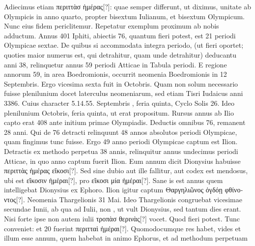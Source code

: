 
%
Adiecimus etiam \textgreek{περιττὰσ ἡμέρας[?]}:
quae semper differunt, ut diximus, unitate ab Olympicis in anno quarto,
propter bisextum Iulianum, et bisextum Olympicum.
Nunc eius
fidem periclitemur.
Repetatur exemplum proximum ab nobis adductum.
Annus 401 Iphiti, abiectis 76, quantum fieri potest, est 21 periodi
Olympicae sextae.
De quibus si accommodata integra periodo,
(ut fieri oportet; quoties maior numerus est, qui detrahitur, quam unde
detrahitur) deducantu anni 38, relinquetur annus 59 periodi
Atticae in Tabula periodi.
%
E regione annorum 59, in area Boedromionis,
occurrit neomenia Boedromionis in 12 Septembris.
Ergo vicesima
sexta fuit in  Octobris.
Quam non solum necessario fuisse
plenilunium docet laterculus neomeniarum, sed etiam Tisri Iudaicus
anni 3386.
Cuius character 5.14.55. Septembris , feria quinta,
Cyclo Solis 26.
Ideo plenilunium  Octobris, feria quinta, ut
erat propositum.
Rursus annus ab Ilio capto erat 408 ante initium
primae Olympiadis.
Deductis omnibus 76, remanent 28 anni.
Qui de 76 detracti relinquunt 48 annos absolutos periodi Olympicae,
quam fingimus tunc fuisse.
Ergo 49 anno periodi Olympicae captum
est Ilion.
Detractis ex methodo perpetua 38 annis, relinquitur annus
undecimus periodi Atticae, in quo anno captum fuerit Ilion.
Eum
annum dicit Dionysius habuisse \textgreek{περιττὰς ἡμέρας εἴκοσι[?]}.
Sed sine dubio
aut ille fallitur, aut codex est mendosus, ubi est
 \textgreek{εἴκοσιν ἡμέραι[?]}, pro
\textgreek{εἴκοσι μία ἡμέραι[?]}.
Sane is est annus quem intelligebat Dionysius ex
Ephoro.
Ilion igitur captum \textgreek{Θαργηλιῶνος ὀγδόῃ φθίνοντος[?]}.
Neomenia Thargelionis 31 Mai.
Ideo  Thargelionis congruebat vicesimae
secundae Iunii, ab qua ad  Iulii, non ,
 ut vult Dionysius,
sed  tantum dies erant.
Nisi forte ipse  non autem  iulii
\textgreek{τροπὰσ θερινὰς[?]} vocet.
Quod fieri potest.
Tunc conveniet: et 20 fuerint
\textgreek{περιτταὶ ἡμέραι[?]}.
Quomodocumque res habet, vides et illum esse
annum, quem habebat in animo Ephorus, et ad methodum perpetuam
